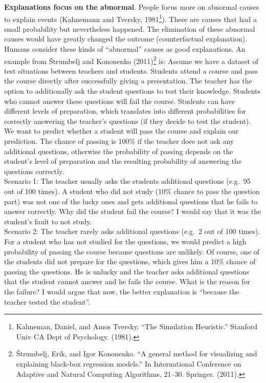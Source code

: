 \documentclass[
  12pt,
]{krantz}
\begin{document}
\textbf{Explanations focus on the abnormal}.
People focus more on abnormal causes to explain events (Kahnemann and Tversky, 1981\footnote{Kahneman, Daniel, and Amos Tversky. ``The Simulation Heuristic.'' Stanford Univ CA Dept of Psychology. (1981).}).
These are causes that had a small probability but nevertheless happened.
The elimination of these abnormal causes would have greatly changed the outcome (counterfactual explanation).
Humans consider these kinds of ``abnormal'' causes as good explanations.
An example from Štrumbelj and Kononenko (2011)\footnote{Štrumbelj, Erik, and Igor Kononenko. ``A general method for visualizing and explaining black-box regression models.'' In International Conference on Adaptive and Natural Computing Algorithms, 21--30. Springer. (2011).} is:
Assume we have a dataset of test situations between teachers and students.
Students attend a course and pass the course directly after successfully giving a presentation.
The teacher has the option to additionally ask the student questions to test their knowledge.
Students who cannot answer these questions will fail the course.
Students can have different levels of preparation, which translates into different probabilities for correctly answering the teacher's questions (if they decide to test the student).
We want to predict whether a student will pass the course and explain our prediction.
The chance of passing is 100\% if the teacher does not ask any additional questions, otherwise the probability of passing depends on the student's level of preparation and the resulting probability of answering the questions correctly.\\
Scenario 1:
The teacher usually asks the students additional questions (e.g.~95 out of 100 times).
A student who did not study (10\% chance to pass the question part) was not one of the lucky ones and gets additional questions that he fails to answer correctly.
Why did the student fail the course?
I would say that it was the student's fault to not study.\\
Scenario 2:
The teacher rarely asks additional questions (e.g.~2 out of 100 times).
For a student who has not studied for the questions, we would predict a high probability of passing the course because questions are unlikely.
Of course, one of the students did not prepare for the questions, which gives him a 10\% chance of passing the questions.
He is unlucky and the teacher asks additional questions that the student cannot answer and he fails the course.
What is the reason for the failure?
I would argue that now, the better explanation is ``because the teacher tested the student''.
\end{document}
